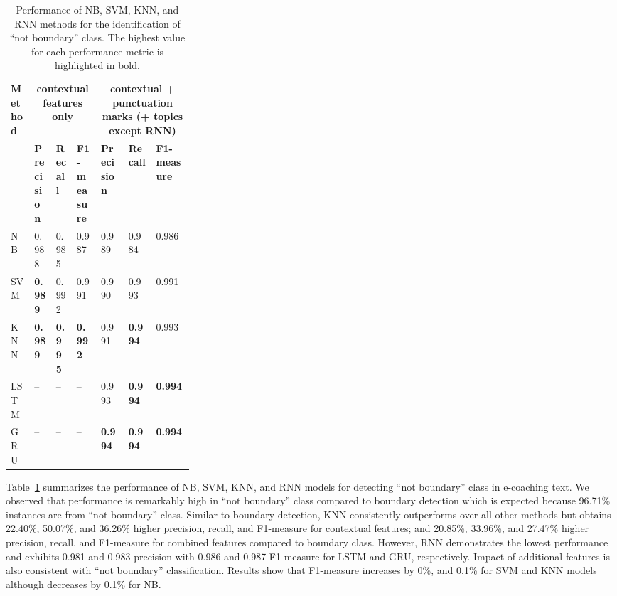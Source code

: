 \documentclass{amia}
\begin{document}
\begin{table}[ht]
\centering
\caption{Performance of NB, SVM, KNN, and RNN methods for the identification of ``not boundary'' class. The highest value for each performance metric is highlighted in bold.}
\label{tab:result_not_boundary}
  \begin{tabular}{|l|l|l|l|p{0.15\linewidth}|p{0.15\linewidth}|l|}
  \hline
   \multirow{2}{*}{\textbf{Method}} & \multicolumn{3}{|c|}{\textbf{contextual features only}} & \multicolumn{3}{|c|}{\textbf{contextual + punctuation marks (+ topics except RNN)}} \\\cline{2-7}
   & \textbf{Precision}  & \textbf{Recall} & \textbf{F1-measure} & \textbf{Precision}  & \textbf{Recall} & \textbf{F1-measure}\\ \hline    
    
 NB & 0.988 & 0.985 & 0.987 & 0.989 & 0.984 & 0.986 \\ \hline
 SVM & \textbf{0.989} & 0.992 & 0.991 & 0.990 & 0.993 & 0.991\\ \hline
 KNN & \textbf{0.989} & \textbf{0.995} & \textbf{0.992} & 0.991 & \textbf{0.994} & 0.993\\ \hline
 LSTM & -- & -- & -- & 0.993 & \textbf{0.994} & \textbf{0.994} \\ \hline
 GRU & -- & -- & -- & \textbf{0.994} & \textbf{0.994} & \textbf{0.994} \\ \hline 
  \end{tabular}
\end{table}

Table~\ref{tab:result_not_boundary} summarizes the performance of NB, SVM, KNN, and RNN models for detecting ``not boundary'' class in e-coaching text. We observed that performance is remarkably high in ``not boundary'' class compared to boundary detection which is expected because 96.71\% instances are from ``not boundary'' class. Similar to boundary detection, KNN consistently outperforms over all other methods but obtains 22.40\%, 50.07\%, and 36.26\% higher precision, recall, and F1-measure for contextual features; and 20.85\%, 33.96\%, and 27.47\% higher precision, recall, and F1-measure for combined features compared to boundary class. However, RNN demonstrates the lowest performance and exhibits 0.981 and 0.983 precision with 0.986 and 0.987 F1-measure for LSTM and GRU, respectively. Impact of additional features is also consistent with ``not boundary'' classification. Results show that F1-measure increases by 0\%, and 0.1\% for SVM and KNN models although decreases by 0.1\% for NB. \\
\end{document}
